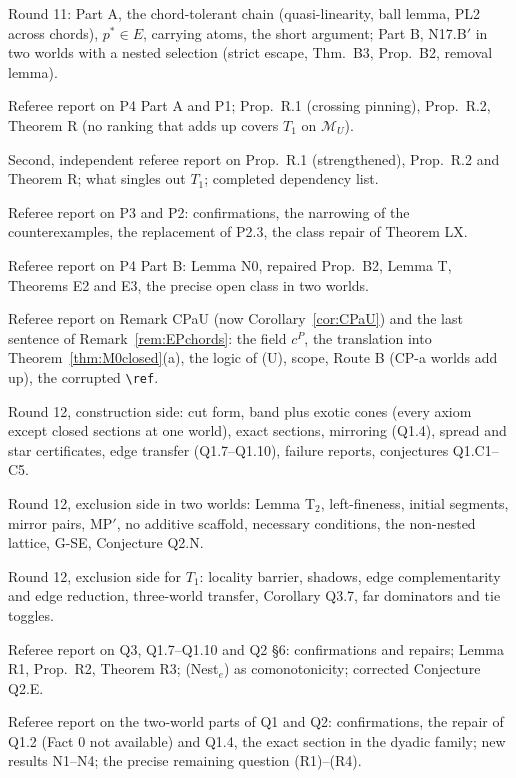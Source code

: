\documentclass[11pt]{article}
\theoremstyle{definition}
\theoremstyle{remark}
\newcommand{\M}{\mathcal M}
\begin{document}
\begin{description}[leftmargin=*,font=\normalfont\ttfamily,style=nextline]
\item[P4\_notes.md] Round 11: Part A, the chord-tolerant chain (quasi-linearity, ball lemma, PL2 across chords), $p^*\in E$, carrying atoms, the short argument; Part B, N17.B$'$ in two worlds with a nested selection (strict escape, Thm.~B3, Prop.~B2, removal lemma).
\item[M0\_referee.md] Referee report on P4 Part A and P1; Prop.~R.1 (crossing pinning), Prop.~R.2, Theorem R (no ranking that adds up covers $T_1$ on $\M_U$).
\item[M0\_second\_referee.md] Second, independent referee report on Prop.~R.1 (strengthened), Prop.~R.2 and Theorem R; what singles out $T_1$; completed dependency list.
\item[P2P3\_referee.md] Referee report on P3 and P2: confirmations, the narrowing of the counterexamples, the replacement of P2.3, the class repair of Theorem LX.
\item[P4B\_referee.md] Referee report on P4 Part B: Lemma N0, repaired Prop.~B2, Lemma T, Theorems E2 and E3, the precise open class in two worlds.
\item[CPaU\_referee.md] Referee report on Remark CPaU (now Corollary~\ref{cor:CPaU}) and the last sentence of Remark~\ref{rem:EPchords}: the field $c^P$, the translation into Theorem~\ref{thm:M0closed}(a), the logic of (U), scope, Route B (CP-a worlds add up), the corrupted \texttt{\textbackslash ref}.
\item[Q1\_notes.md] Round 12, construction side: cut form, band plus exotic cones (every axiom except closed sections at one world), exact sections, mirroring (Q1.4), spread and star certificates, edge transfer (Q1.7--Q1.10), failure reports, conjectures Q1.C1--C5.
\item[Q2\_notes.md] Round 12, exclusion side in two worlds: Lemma T$_2$, left-fineness, initial segments, mirror pairs, MP$'$, no additive scaffold, necessary conditions, the non-nested lattice, G-SE, Conjecture Q2.N.
\item[Q3\_notes.md] Round 12, exclusion side for $T_1$: locality barrier, shadows, edge complementarity and edge reduction, three-world transfer, Corollary Q3.7, far dominators and tie toggles.
\item[Q3\_referee.md] Referee report on Q3, Q1.7--Q1.10 and Q2 \S6: confirmations and repairs; Lemma R1, Prop.~R2, Theorem R3; (Nest$_e$) as comonotonicity; corrected Conjecture Q2.E.
\item[Q12\_referee.md] Referee report on the two-world parts of Q1 and Q2: confirmations, the repair of Q1.2 (Fact 0 not available) and Q1.4, the exact section in the dyadic family; new results N1--N4; the precise remaining question (R1)--(R4).

\end{description}
\end{document}
